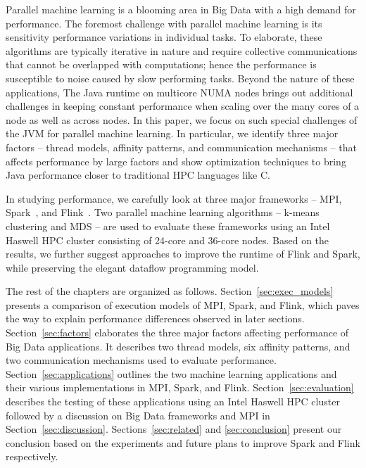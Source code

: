 \documentclass[10pt, conference, compsocconf]{IEEEtran}
\begin{document}
Parallel machine learning is a blooming area in Big Data with a high demand for performance. The foremost challenge with parallel machine learning is its sensitivity performance variations in individual tasks. To elaborate, these algorithms are typically iterative in nature and require collective communications that cannot be overlapped with computations; hence the performance is susceptible to noise caused by slow performing tasks. Beyond the nature of these applications, The Java runtime on multicore \ac{NUMA} nodes brings out additional challenges in keeping constant performance when scaling over the many cores of a node as well as across nodes. In this paper, we focus on such special challenges of the \ac{JVM} for parallel machine learning. In particular, we identify three major factors -- thread models, affinity patterns, and communication mechanisms -- that affects performance by large factors and show optimization techniques to bring Java performance closer to traditional \ac{HPC} languages like C.

In studying performance, we carefully look at three major frameworks -- \ac{MPI}, Spark~\cite{Zaharia:2010:SCC:1863103.1863113}, and Flink~\cite{apache_flink, carbone2015lightweight}. Two parallel machine learning algorithms -- k-means clustering and \ac{MDS} -- are used to evaluate these frameworks using an Intel Haswell \ac{HPC} cluster consisting of 24-core and 36-core nodes. Based on the results, we further suggest approaches to improve the runtime of Flink and Spark, while preserving the elegant dataflow programming model.

The rest of the chapters are organized as follows. Section~\ref{sec:exec_models} presents a comparison of execution models of \ac{MPI}, Spark, and Flink, which paves the way to explain performance differences observed in later sections. Section~\ref{sec:factors} elaborates the three major factors affecting performance of Big Data applications. It describes two thread models, six affinity patterns, and two communication mechanisms used to evaluate performance. Section~\ref{sec:applications} outlines the two machine learning applications and their various implementations in \ac{MPI}, Spark, and Flink. Section~\ref{sec:evaluation} describes the testing of these applications using an Intel Haswell \ac{HPC} cluster followed by a discussion on Big Data frameworks and \ac{MPI} in Section~\ref{sec:discussion}. Sections~\ref{sec:related} and \ref{sec:conclusion} present our conclusion based on the experiments and future plans to improve Spark and Flink respectively.
\end{document}
